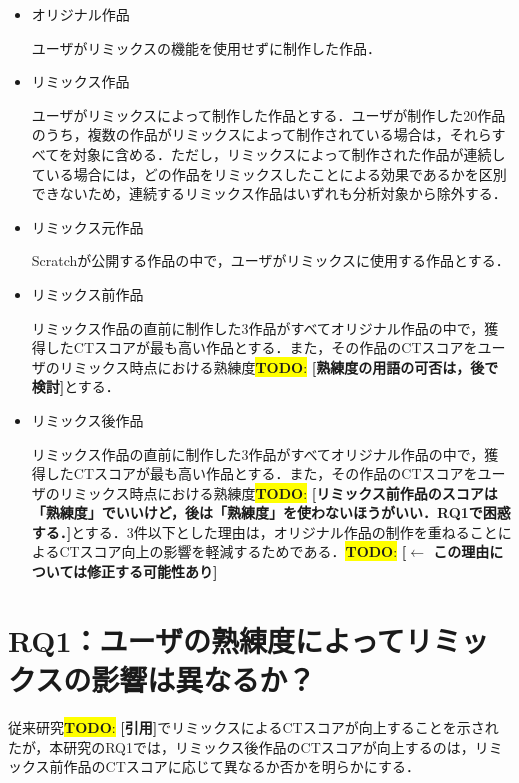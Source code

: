 \documentclass[submit,techrep,noauthor]{ipsj}
\newcommand{\todo}[1]{\colorbox{yellow}{{\bf TODO}:}{\color{red} {\textbf{[#1]}}}}
\begin{document}
\begin{itemize}
    \item オリジナル作品
  
    ユーザがリミックスの機能を使用せずに制作した作品．

    \item リミックス作品

    ユーザがリミックスによって制作した作品とする．ユーザが制作した20作品のうち，複数の作品がリミックスによって制作されている場合は，それらすべてを対象に含める．ただし，リミックスによって制作された作品が連続している場合には，どの作品をリミックスしたことによる効果であるかを区別できないため，連続するリミックス作品はいずれも分析対象から除外する．
     
    \item リミックス元作品

    Scratchが公開する作品の中で，ユーザがリミックスに使用する作品とする．
    
    \item リミックス前作品
  
    リミックス作品の直前に制作した3作品がすべてオリジナル作品の中で，獲得したCTスコアが最も高い作品とする．また，その作品のCTスコアをユーザのリミックス時点における熟練度\todo{熟練度の用語の可否は，後で検討}とする．

    \item リミックス後作品
  
    リミックス作品の直前に制作した3作品がすべてオリジナル作品の中で，獲得したCTスコアが最も高い作品とする．また，その作品のCTスコアをユーザのリミックス時点における熟練度\todo{リミックス前作品のスコアは「熟練度」でいいけど，後は「熟練度」を使わないほうがいい．RQ1で困惑する．}とする．3件以下とした理由は，オリジナル作品の制作を重ねることによるCTスコア向上の影響を軽減するためである．\todo{$\leftarrow$ この理由については修正する可能性あり}
\end{itemize}



\section{RQ1：ユーザの熟練度によってリミックスの影響は異なるか？}
\label{sec:rq1}

従来研究\todo{引用}でリミックスによるCTスコアが向上することを示されたが，本研究のRQ1では，リミックス後作品のCTスコアが向上するのは，リミックス前作品のCTスコアに応じて異なるか否かを明らかにする．
\end{document}

